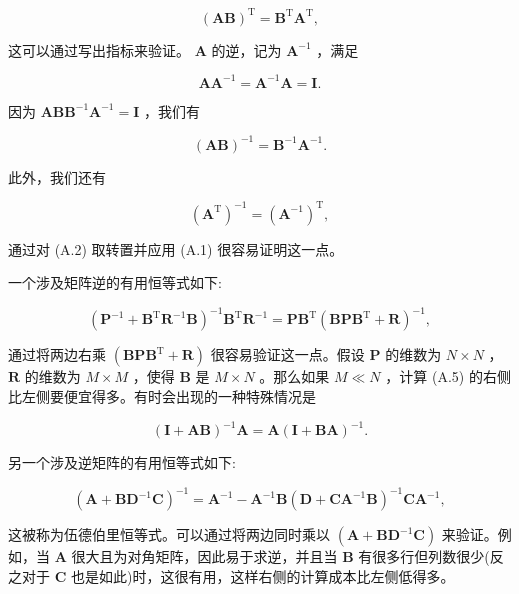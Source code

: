 \documentclass[10pt]{article}
\newcommand{\customfootnote}[1]{
  \let\thefootnote\relax\footnotetext{#1}
}
\begin{document}
\[
{\left( \mathbf{{AB}}\right) }^{\mathrm{T}} = {\mathbf{B}}^{\mathrm{T}}{\mathbf{A}}^{\mathrm{T}}, \tag{A.1}
\]

这可以通过写出指标来验证。 \(\mathbf{A}\) 的逆，记为 \({\mathbf{A}}^{-1}\) ，满足

\[
\mathbf{A}{\mathbf{A}}^{-1} = {\mathbf{A}}^{-1}\mathbf{A} = \mathbf{I}. \tag{A.2}
\]

因为 \(\mathbf{A}\mathbf{B}{\mathbf{B}}^{-1}{\mathbf{A}}^{-1} = \mathbf{I}\) ，我们有

\[
{\left( \mathbf{{AB}}\right) }^{-1} = {\mathbf{B}}^{-1}{\mathbf{A}}^{-1}. \tag{A.3}
\]

此外，我们还有

\[
{\left( {\mathbf{A}}^{\mathrm{T}}\right) }^{-1} = {\left( {\mathbf{A}}^{-1}\right) }^{\mathrm{T}}, \tag{A.4}
\]

通过对 (A.2) 取转置并应用 (A.1) 很容易证明这一点。

\customfootnote{

609

}

一个涉及矩阵逆的有用恒等式如下:

\[
{\left( {\mathbf{P}}^{-1} + {\mathbf{B}}^{\mathrm{T}}{\mathbf{R}}^{-1}\mathbf{B}\right) }^{-1}{\mathbf{B}}^{\mathrm{T}}{\mathbf{R}}^{-1} = \mathbf{P}{\mathbf{B}}^{\mathrm{T}}{\left( \mathbf{B}\mathbf{P}{\mathbf{B}}^{\mathrm{T}} + \mathbf{R}\right) }^{-1}, \tag{A.5}
\]

通过将两边右乘 \(\left( {{\mathbf{{BPB}}}^{\mathrm{T}} + \mathbf{R}}\right)\) 很容易验证这一点。假设 \(\mathbf{P}\) 的维数为 \(N \times  N\) ， \(\mathbf{R}\) 的维数为 \(M \times  M\) ，使得 \(\mathbf{B}\) 是 \(M \times  N\) 。那么如果 \(M \ll  N\) ，计算 (A.5) 的右侧比左侧要便宜得多。有时会出现的一种特殊情况是

\[
{\left( \mathbf{I} + \mathbf{{AB}}\right) }^{-1}\mathbf{A} = \mathbf{A}{\left( \mathbf{I} + \mathbf{{BA}}\right) }^{-1}. \tag{A.6}
\]

另一个涉及逆矩阵的有用恒等式如下:

\[
{\left( \mathbf{A} + {\mathbf{{BD}}}^{-1}\mathbf{C}\right) }^{-1} = {\mathbf{A}}^{-1} - {\mathbf{A}}^{-1}\mathbf{B}{\left( \mathbf{D} + {\mathbf{{CA}}}^{-1}\mathbf{B}\right) }^{-1}{\mathbf{{CA}}}^{-1}, \tag{A.7}
\]

这被称为伍德伯里恒等式。可以通过将两边同时乘以 \(\left( {\mathbf{A} + {\mathbf{{BD}}}^{-1}\mathbf{C}}\right)\) 来验证。例如，当 \(\mathbf{A}\) 很大且为对角矩阵，因此易于求逆，并且当 \(\mathbf{B}\) 有很多行但列数很少(反之对于 \(\mathbf{C}\) 也是如此)时，这很有用，这样右侧的计算成本比左侧低得多。
\end{document}
